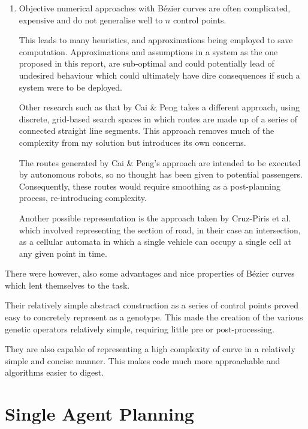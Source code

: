 \begin{enumerate}
  \item Objective numerical approaches with Bézier curves are often complicated, expensive and do not generalise well to $n$ control points.

        This leads to many heuristics, and approximations being employed to save computation. Approximations and assumptions in a system as the one proposed in this report, are sub-optimal and could potentially lead of undesired behaviour which could ultimately have dire consequences if such a system were to be deployed.

        Other research such as that by Cai \& Peng\cite{caiCooperativeCoevolutionaryAdaptive2002} takes a different approach, using discrete, grid-based search spaces in which routes are made up of a series of connected straight line segments. This approach removes much of the complexity from my solution but introduces its own concerns.

        The routes generated by Cai \& Peng's approach are intended to be executed by autonomous robots, so no thought has been given to potential passengers. Consequently, these routes would require smoothing as a post-planning process, re-introducing complexity.

        Another possible representation is the approach taken by Cruz-Piris et al.\cite{cruz-pirisAutomatedOptimizationIntersections2019} which involved representing the section of road, in their case an intersection, as a cellular automata in which a single vehicle can occupy a single cell at any given point in time. \end{enumerate}


There were however, also some advantages and nice properties of Bézier curves which lent themselves to the task.

Their relatively simple abstract construction as a series of control points proved easy to concretely represent as a genotype. This made the creation of the various genetic operators relatively simple, requiring little pre or post-processing.

They are also capable of representing a high complexity of curve in a relatively simple and concise manner. This makes code much more approachable and algorithms easier to digest.

\section{Single Agent Planning}

